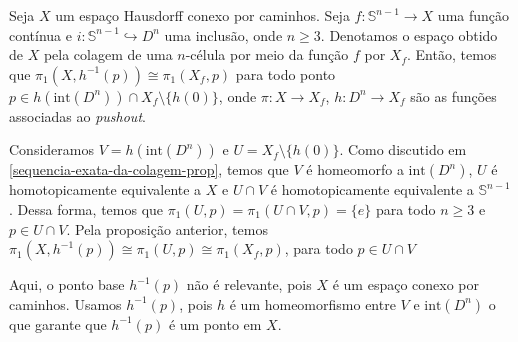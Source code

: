 \begin{corol}
    Seja $X$ um espaço Hausdorff conexo por caminhos. Seja $f:\mathbb{S}^{n-1}\rightarrow X$ uma função contínua e $i:\mathbb{S}^{n-1}\hookrightarrow D^n$ uma inclusão, onde $n\ge 3$. Denotamos o espaço obtido de $X$ pela colagem de uma $n$-célula por meio da função $f$ por $X_f$. Então, temos que $\pi_1(X,h^{-1}(p))\cong \pi_1(X_f, p)$ para todo ponto $p\in h(\text{int}(D^n))\cap X_f\setminus\{h(0)\}$, onde $\pi:X\rightarrow X_f$, $h:D^n\rightarrow X_f$ são as funções associadas ao \emph{pushout}.
\end{corol}
\begin{dem}
     Consideramos $V=h(\text{int}(D^n))$ e $U=X_f\setminus \{h(0)\}$. Como discutido em \ref{sequencia-exata-da-colagem-prop}, temos que $V$ é homeomorfo a $\text{int}(D^n)$, $U$ é homotopicamente equivalente a $X$ e $U\cap V$ é homotopicamente equivalente a $\mathbb{S}^{n-1}$. Dessa forma, temos que $\pi_1(U,p)=\pi_1(U\cap V,p)=\{e\}$ para todo $n\ge 3$ e $p\in U\cap V$. Pela proposição anterior, temos $\pi_1(X,h^{-1}(p))\cong\pi_1(U,p)\cong \pi_1(X_f, p)$, para todo $p\in U\cap V$
\end{dem}
Aqui, o ponto base $h^{-1}(p)$ não é relevante, pois $X$ é um espaço conexo por caminhos. Usamos $h^{-1}(p)$, pois $h$ é um homeomorfismo entre $V$ e $\text{int}(D^n)$ o que garante que $h^{-1}(p)$ é um ponto em $X$.